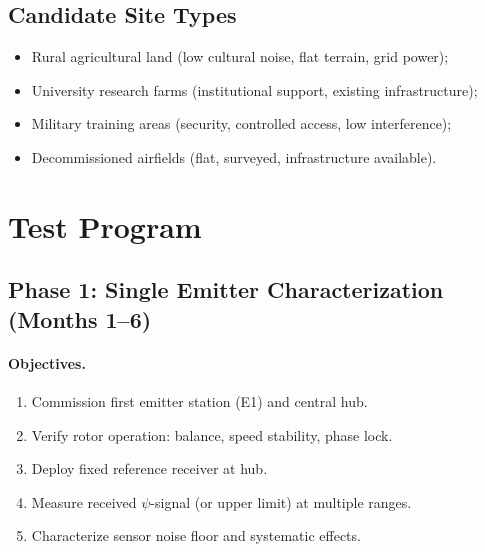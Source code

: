 \documentclass[11pt,a4paper]{article}
\begin{document}
\subsection{Candidate Site Types}

\begin{itemize}
\item Rural agricultural land (low cultural noise, flat terrain, grid power);
\item University research farms (institutional support, existing infrastructure);
\item Military training areas (security, controlled access, low interference);
\item Decommissioned airfields (flat, surveyed, infrastructure available).
\end{itemize}

\section{Test Program}

\subsection{Phase 1: Single Emitter Characterization (Months 1--6)}

\paragraph{Objectives.}
\begin{enumerate}
\item Commission first emitter station (E1) and central hub.
\item Verify rotor operation: balance, speed stability, phase lock.
\item Deploy fixed reference receiver at hub.
\item Measure received $\psi$-signal (or upper limit) at multiple ranges.
\item Characterize sensor noise floor and systematic effects.
\end{enumerate}
\end{document}
